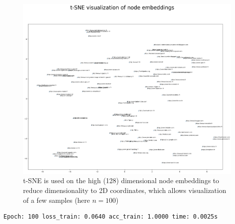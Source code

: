 \documentclass[a4paper]{article}
\begin{document}
\begin{figure}[ht]
    \centering
    \includegraphics[width=.6\textwidth]{figures/tSNE_node_embeddings.png}
    \caption{t-SNE is used on the high (128) dimensional node embeddings to reduce dimensionality to 2D coordinates,
    which allows visualization of a few samples (here $n=100$)}
    \label{fig:node_embeddings}
\end{figure}



\begin{verbatim}
Epoch: 100 loss_train: 0.0640 acc_train: 1.0000 time: 0.0025s
\end{verbatim}


\end{document}
